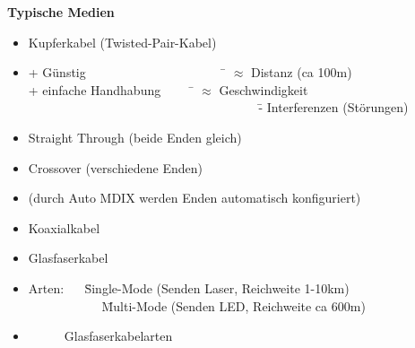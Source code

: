 \textbf{Typische Medien}
\begin{itemize}
	\item Kupferkabel (Twisted-Pair-Kabel)
	\item[] \begin{tabbing}
		+ Günstig ~~~~~~~~~~~~~~~~~~~~~ \= $\approx$ Distanz (ca 100m) \\
		+ einfache Handhabung ~~~~ \= $\approx$ Geschwindigkeit \\
		~~~~~~~~~~~~~~~~~~~~~~~~~~~~~~~~~~~~ \= - Interferenzen (Störungen) \\
	\end{tabbing}
	\item[] Straight Through (beide Enden gleich)
	\item[] Crossover (verschiedene Enden)
	\item[] (durch Auto MDIX werden Enden automatisch konfiguriert)
	\item Koaxialkabel
	\item Glasfaserkabel
	\item[] \begin{tabbing}
		Arten: ~~ \= Single-Mode (Senden Laser, Reichweite 1-10km) \\
		~~~~~~~~~~~ \= Multi-Mode (Senden LED, Reichweite ca 600m)
	\end{tabbing}
	\item[] \begin{figure}[H]%
		\centering
		\qquad
		\caption{Glasfaserkabelarten}%
		\label{fig:example}%
	\end{figure}

\end{itemize}
